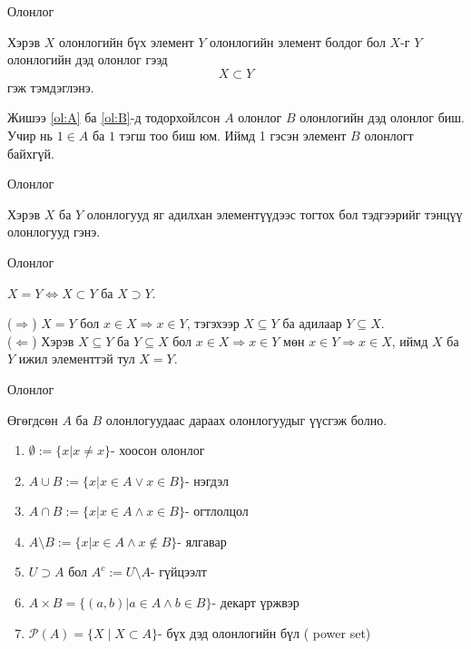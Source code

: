 \begin{frame}[allowframebreaks]{Олонлог}
\begin{definition}
Хэрэв $X$ олонлогийн бүх элемент $Y$ олонлогийн элемент болдог бол $X$-г $Y$ олонлогийн дэд олонлог гээд $$X\subset Y$$ гэж тэмдэглэнэ. 
\end{definition}
Жишээ \ref{ol:A} ба \ref{ol:B}-д тодорхойлсон  $A$ олонлог  $B$ олонлогийн дэд олонлог биш. Учир нь $1\in A$ ба $1$ тэгш тоо биш юм. Иймд 1 гэсэн элемент $B$ олонлогт байхгүй.
\end{frame}

\begin{frame}[allowframebreaks]{Олонлог}
\begin{definition}
Хэрэв $X$ ба $Y$ олонлогууд яг адилхан элементүүдээс тогтох бол тэдгээрийг тэнцүү олонлогууд гэнэ. 
\end{definition}
\end{frame}

\begin{frame}[allowframebreaks]{Олонлог}
\begin{theorem}\label{Олонлог тэнцэх нөхцөл}
$X=Y\Leftrightarrow X\subset Y$ ба $X\supset Y.$ 
\end{theorem}
\begin{prof} 
($\Rightarrow$) $X=Y$ бол $x\in X\Rightarrow x\in Y$, тэгэхээр $X\subseteq Y$ ба адилаар  $Y\subseteq X$.\\
($\Leftarrow$) Хэрэв $X\subseteq Y$ ба $Y\subseteq X$ бол $x\in X\Rightarrow x\in Y$ мөн $x\in Y\Rightarrow x\in X$, иймд $X$ ба $Y$ ижил элементтэй тул $X=Y$.
\end{prof}
\end{frame}

\begin{frame}[allowframebreaks]{Олонлог}
\begin{definition}
 Өгөгдсөн $A$ ба $B$ олонлогуудаас дараах олонлогуудыг үүсгэж болно.
\begin{enumerate}
\item $\emptyset:=\{x|x\neq x\}$- хоосон олонлог
\item $A\cup B:=\{x| x\in A \lor x\in B\}$- нэгдэл
\item $A\cap B:=\{x| x\in A \land x\in B\}$- огтлолцол
\item $A\setminus B:=\{x| x\in A \land x\notin B\}$- ялгавар 
\item $U\supset A$ бол $A^c:=U\setminus A$- гүйцээлт
\item $A\times B=\{(a,b)|a\in A \land b\in B\}$- декарт үржвэр
\item $\mathcal{P}(A)=\{X\mid X\subset A\}$- бүх дэд олонлогийн бүл ( power set)
\end{enumerate}
\end{definition}
\end{frame}

